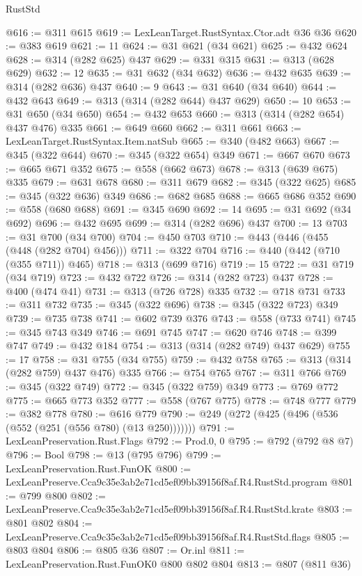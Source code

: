 \begin{lexlean}{RustStd}
\begin{coremodule}
@616 := @311 @615
@619 := LexLeanTarget.RustSyntax.Ctor.adt @36 @36
@620 := @383 @619
@621 := 11
@624 := @31 @621 (@34 @621)
@625 := @432 @624
@628 := @314 (@282 @625) @437
@629 := @331 @315
@631 := @313 (@628 @629)
@632 := 12
@635 := @31 @632 (@34 @632)
@636 := @432 @635
@639 := @314 (@282 @636) @437
@640 := 9
@643 := @31 @640 (@34 @640)
@644 := @432 @643
@649 := @313 (@314 (@282 @644) @437 @629)
@650 := 10
@653 := @31 @650 (@34 @650)
@654 := @432 @653
@660 := @313 (@314 (@282 @654) @437 @476) @335
@661 := @649 @660
@662 := @311 @661
@663 := LexLeanTarget.RustSyntax.Item.natSub
@665 := @340 (@482 @663)
@667 := @345 (@322 @644)
@670 := @345 (@322 @654) @349
@671 := @667 @670
@673 := @665 @671 @352
@675 := @558 (@662 @673)
@678 := @313 (@639 @675) @335
@679 := @631 @678
@680 := @311 @679
@682 := @345 (@322 @625)
@685 := @345 (@322 @636) @349
@686 := @682 @685
@688 := @665 @686 @352
@690 := @558 (@680 @688)
@691 := @345 @690
@692 := 14
@695 := @31 @692 (@34 @692)
@696 := @432 @695
@699 := @314 (@282 @696) @437
@700 := 13
@703 := @31 @700 (@34 @700)
@704 := @450 @703
@710 := @443 (@446 (@455 (@448 (@282 @704) @456)))
@711 := @322 @704
@716 := @440 (@442 (@710 (@355 @711)) @465)
@718 := @313 (@699 @716)
@719 := 15
@722 := @31 @719 (@34 @719)
@723 := @432 @722
@726 := @314 (@282 @723) @437
@728 := @400 (@474 @41)
@731 := @313 (@726 @728) @335
@732 := @718 @731
@733 := @311 @732
@735 := @345 (@322 @696)
@738 := @345 (@322 @723) @349
@739 := @735 @738
@741 := @602 @739 @376
@743 := @558 (@733 @741)
@745 := @345 @743 @349
@746 := @691 @745
@747 := @620 @746
@748 := @399 @747
@749 := @432 @184
@754 := @313 (@314 (@282 @749) @437 @629)
@755 := 17
@758 := @31 @755 (@34 @755)
@759 := @432 @758
@765 := @313 (@314 (@282 @759) @437 @476) @335
@766 := @754 @765
@767 := @311 @766
@769 := @345 (@322 @749)
@772 := @345 (@322 @759) @349
@773 := @769 @772
@775 := @665 @773 @352
@777 := @558 (@767 @775)
@778 := @748 @777
@779 := @382 @778
@780 := @616 @779
@790 := @249 (@272 (@425 (@496 (@536 (@552 (@251 (@556 @780) (@13 @250)))))))
@791 := LexLeanPreservation.Rust.Flags
@792 := Prod.{0, 0}
@795 := @792 (@792 @8 @7)
@796 := Bool
@798 := @13 (@795 @796)
@799 := LexLeanPreservation.Rust.FunOK
@800 := LexLeanPreserve.Cca9c35e3ab2e71cd5ef09bb39156f8af.R4.RustStd.program
@801 := @799 @800
@802 := LexLeanPreserve.Cca9c35e3ab2e71cd5ef09bb39156f8af.R4.RustStd.krate
@803 := @801 @802
@804 := LexLeanPreserve.Cca9c35e3ab2e71cd5ef09bb39156f8af.R4.RustStd.flags
@805 := @803 @804
@806 := @805 @36
@807 := Or.inl
@811 := LexLeanPreservation.Rust.FunOK0 @800 @802 @804
@813 := @807 (@811 @36)

\end{coremodule}
\end{lexlean}
